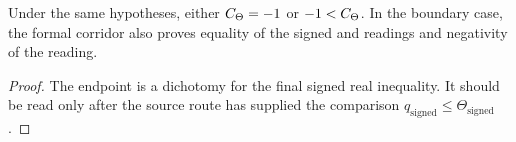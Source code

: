 \begin{theorem}
  \label{thm:strict-boundary-alternatives}
  \leanok
  Under the same hypotheses, either \(C_\Theta=-1\) or \(-1<C_\Theta\).  In the
  boundary case, the formal corridor also proves equality of the signed
  \qPilot{} and \ThetaPilot{} readings and negativity of the \ThetaPilot{}
  reading.
\end{theorem}

\begin{proof}
  The endpoint is a dichotomy for the final signed real inequality.  It should
  be read only after the source route has supplied the comparison
  \(q_{\mathrm{signed}}\le \Theta_{\mathrm{signed}}\).
\end{proof}
